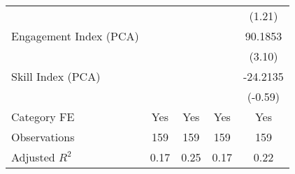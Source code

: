 {\begin{tabular}{l*{4}{c}}
                                   &                   &                   &                   &    (1.21)         \\
[1em]
Engagement Index (PCA)             &                   &                   &                   &   90.1853\sym{***}\\
                                   &                   &                   &                   &    (3.10)         \\
[1em]
Skill Index (PCA)                  &                   &                   &                   &  -24.2135         \\
                                   &                   &                   &                   &   (-0.59)         \\
[1em]
Category FE                        &       Yes         &       Yes         &       Yes         &       Yes         \\
\hline
Observations                       &       159         &       159         &       159         &       159         \\
Adjusted \(R^{2}\)                 &      0.17         &      0.25         &      0.17         &      0.22         \\
\hline\hline
\end{tabular}
}
